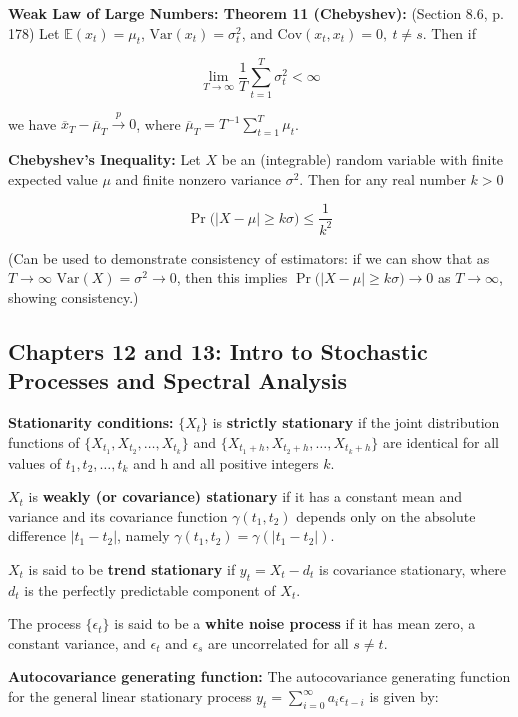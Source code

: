 \documentclass{article}
\newcommand{\E}{\mathbb{E}}
\newcommand{\Var}{\mathrm{Var}}
\newcommand{\Cov}{\mathrm{Cov}}
\begin{document}
\textbf{Weak Law of Large Numbers: Theorem 11 (Chebyshev):} (Section 8.6, p. 178) Let \(\E(x_t) = \mu_t\), \(\Var(x_t) = \sigma_t^2\), and \(\Cov(x_t, x_t) = 0, \ t \neq s\). Then if 

\[
\lim_{T \to \infty} \frac{1}{T} \sum_{t=1}^T \sigma_t^2 < \infty
\]

we have \(\overline{x}_T - \overline{\mu}_T \xrightarrow{p} 0\), where \( \overline{\mu}_T = T^{-1} \sum_{t=1}^T \mu_t\).

\textbf{Chebyshev's Inequality:} Let \(X\) be an (integrable) random variable with finite expected value \(\mu\) and finite nonzero variance \(\sigma^2\). Then for any real number \(k > 0\)

\[
\Pr \big(\left| X - \mu \right| \geq k \sigma \big) \leq \frac{1}{k^2}
\] 

(Can be used to demonstrate consistency of estimators: if we can show that as \(T \to \infty\) \(\Var(X) = \sigma^2 \to 0\), then this implies \(\Pr \big(\left| X - \mu \right| \geq k \sigma \big) \to 0\) as \(T \to \infty\), showing consistency.)

\subsection{Chapters 12 and 13: Intro to Stochastic Processes and Spectral Analysis}

\textbf{Stationarity conditions:} \( \{X_t\} \) is \textbf{strictly stationary} if the joint distribution functions of \( \{ X_{t_1}, X_{t_2}, \ldots, X_{t_k}\} \) and \( \{ X_{t_1+h}, X_{t_2+h}, \ldots, X_{t_k+h}\} \) are identical for all values of \(t_1,  t_2, \ldots, t_k\) and h and all positive integers \(k\). 

\(X_t\) is \textbf{weakly (or covariance) stationary} if it has a constant mean and variance and its covariance function \(\gamma(t_1, t_2)\) depends only on the absolute difference \(| t_1 - t_2|\), namely \(\gamma(t_1, t_2) = \gamma(|t_1 - t_2|)\).

\(X_t\) is said to be \textbf{trend stationary} if \(y_t = X_t - d_t\) is covariance stationary, where \(d_t\) is the perfectly predictable component of \(X_t\).

The process \(\{\epsilon_t\} \) is said to be a \textbf{white noise process} if it has mean zero, a constant variance, and \(\epsilon_t\) and \(\epsilon_s\) are uncorrelated for all \(s \neq t\).

\textbf{Autocovariance generating function:} The autocovariance generating function for the general linear stationary process \(y_t = \sum_{i=0}^\infty a_i \epsilon_{t-i}\) is given by:
\end{document}
